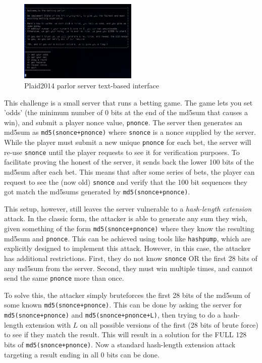 \begin{figure}[!ht]
\centering
\includegraphics[width=0.5\textwidth]{parlor_interface.png}
\caption{Plaid2014 parlor server text-based interface}\label{fig:parlor_interface}
\end{figure}


This challenge is a small server that runs a betting game. The game
lets you set 'odds' (the minimum number of $0$ bits at the end of the
md5sum that causes a win), and submit a player nonce value,
\texttt{pnonce}.  The server then generates an md5sum as
\texttt{md5(snonce+pnonce)} where \texttt{snonce} is a nonce supplied
by the server. While the player must submit a new unique
\texttt{pnonce} for each bet, the server will re-use \texttt{snonce}
until the player requests to see it for verification purposes. To
facilitate proving the honest of the server, it sends back the lower
100 bits of the md5sum after each bet. This means that after some
series of bets, the player can request to see the (now old)
\texttt{snonce} and verify that the 100 bit sequences they got match
the md5sums generated by \texttt{md5(snonce+pnonce)}.

This setup, however, still leaves the server vulnerable to a
\textit{hash-length extension} attack. In the classic form, the
attacker is able to generate any sum they wish, given something of the
form \texttt{md5(snonce+pnonce)} where they know the resulting md5sum
and \texttt{pnonce}. This can be achieved using tools like
\texttt{hashpump}, which are explicitly designed to implement this
attack. However, in this case, the attacker has additional
restrictions. First, they do not know \texttt{snonce} OR the first 28
bits of any md5sum from the server. Second, they must win multiple
times, and cannot send the same \texttt{pnonce} more than once.

To solve this, the attacker simply bruteforces the first 28 bits of
the md5sum of some known \texttt{md5(snonce+pnonce)}. This can be done
by asking the server for \texttt{md5(snonce+pnonce)} and
\texttt{md5(snonce+pnonce+L)}, then trying to do a hash-length
extension with $L$ on all possible versions of the first (28 bits of
brute force) to see if they match the result. This will result in a
solution for the FULL 128 bits of \texttt{md5(snonce+pnonce)}. Now a
standard hash-length extension attack targeting a result ending in all
0 bits can be done.\cite{parlor:mslc}

